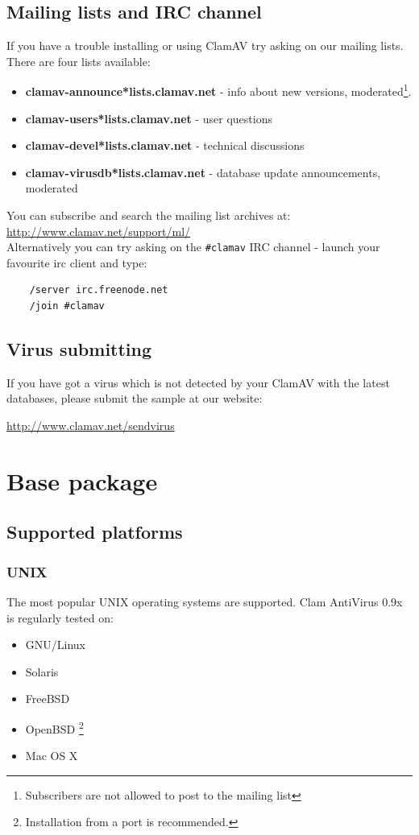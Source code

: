 \documentclass[a4paper,titlepage,12pt]{article}
\begin{document}
    \subsection{Mailing lists and IRC channel}
    If you have a trouble installing or using ClamAV try asking on our mailing
    lists. There are four lists available:
    \begin{itemize}
    \item \textbf{clamav-announce*lists.clamav.net} - info about new versions,
    moderated\footnote{Subscribers are not allowed to post to the mailing
    list}.
    \item \textbf{clamav-users*lists.clamav.net} - user questions
    \item \textbf{clamav-devel*lists.clamav.net} - technical discussions
    \item \textbf{clamav-virusdb*lists.clamav.net} - database update announcements, moderated
    \end{itemize}
    \noindent You can subscribe and search the mailing list archives at: 
    \url{http://www.clamav.net/support/ml/}\\
    Alternatively you can try asking on the \verb+#clamav+ IRC channel - launch
    your favourite irc client and type:
    \begin{verbatim}
	/server irc.freenode.net
	/join #clamav
    \end{verbatim}

    \subsection{Virus submitting}
    If you have got a virus which is not detected by your ClamAV with the latest
    databases, please submit the sample at our website:
    \begin{center}
	\url{http://www.clamav.net/sendvirus}
    \end{center}

    \section{Base package}

    \subsection{Supported platforms}
	\subsubsection{UNIX}
	The most popular UNIX operating systems are supported. Clam AntiVirus 0.9x is
	regularly tested on:
	\begin{itemize}
	    \item{GNU/Linux}
	    \item{Solaris}
	    \item{FreeBSD}
	    \item{OpenBSD} \footnote{Installation from a port is recommended.}
	    \item{Mac OS X}
	\end{itemize}
\end{document}
